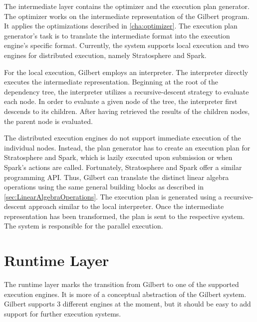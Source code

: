 The intermediate layer contains the optimizer and the execution plan generator.
The optimizer works on the intermediate representation of the Gilbert program.
It applies the optimizations described in \cref{cha:optimizer}.
The execution plan generator's task is to translate the intermediate format into the execution engine's specific format.
Currently, the system supports local execution and two engines for distributed execution, namely Stratosphere and Spark.

For the local execution, Gilbert employs an interpreter.
The interpreter directly executes the intermediate representation.
Beginning at the root of the dependency tree, the interpreter utilizes a recursive-descent strategy to evaluate each node.
In order to evaluate a given node of the tree, the interpreter first descends to its children.
After having retrieved the results of the children nodes, the parent node is evaluated.

The distributed execution engines do not support immediate execution of the individual nodes.
Instead, the plan generator has to create an execution plan for Stratosphere and Spark, which is lazily executed upon submission or when Spark's actions are called.
Fortunately, Stratosphere and Spark offer a similar programming API.
Thus, Gilbert can translate the distinct linear algebra operations using the same general building blocks as described in \cref{sec:LinearAlgebraOperations}.
The execution plan is generated using a recursive-descent approach similar to the local interpreter.
Once the intermediate representation has been transformed, the plan is sent to the respective system.
The system is responsible for the parallel execution.

\section{Runtime Layer}

The runtime layer marks the transition from Gilbert to one of the supported execution engines.
It is more of a conceptual abstraction of the Gilbert system.
Gilbert supports 3 different engines at the moment, but it should be easy to add support for further execution systems.
